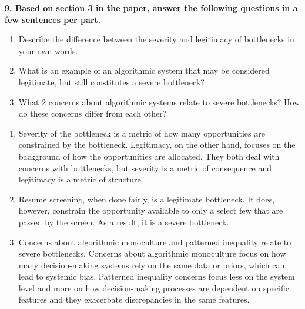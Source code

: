 \documentclass{article}
\begin{document}
\textbf{9. Based on section 3 in the paper, answer the following questions in a few sentences per part.}
\begin{enumerate}[label=\Alph*.]
\item Describe the difference between the severity and legitimacy of bottlenecks in your own words.
\item What is an example of an algorithmic system that may be considered legitimate, but still constitutes a severe bottleneck?
\item What 2 concerns about algorithmic systems relate to severe bottlenecks? How do these concerns differ from each other?
\end{enumerate}

\bigskip
\begin{mdframed}
\begin{enumerate}[label=\Alph*.]
\item Severity of the bottleneck is a metric of how many opportunities are constrained by the bottleneck. Legitimacy, on the other hand, focuses on the background of how the opportunities are allocated. They both deal with concerns with bottlenecks, but severity is a metric of consequence and legitimacy is a metric of structure.
\item Resume screening, when done fairly, is a legitimate bottleneck. It does, however, constrain the opportunity available to only a select few that are passed by the screen. As a result, it is a severe bottleneck.
\item Concerns about algorithmic monoculture and patterned inequality relate to severe bottlenecks. Concerns about algorithmic monoculture focus on how many decision-making systems rely on the same data or priors, which can lead to systemic bias. Patterned inequality concerns focus less on the system level and more on how decision-making processes are dependent on specific features and they exacerbate discrepancies in the same features. 
\end{enumerate}
\end{mdframed}
\bigskip
\end{document}
